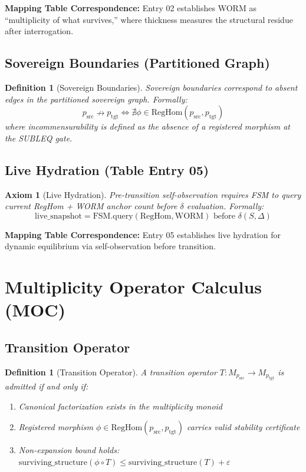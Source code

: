 \documentclass[11pt,a4paper]{article}
\newtheorem{definition}[theorem]{Definition}
\newtheorem{axiom}[theorem]{Axiom}
\begin{document}
\textbf{Mapping Table Correspondence:} Entry 02 establishes WORM as ``multiplicity of what survives,'' where thickness measures the structural residue after interrogation.

\subsection{Sovereign Boundaries (Partitioned Graph)}

\begin{definition}[Sovereign Boundaries]\label{def:boundaries}
Sovereign boundaries correspond to absent edges in the partitioned sovereign graph. Formally:
$$p_{\text{src}} \nrightarrow p_{\text{tgt}} \iff \nexists \phi \in \text{RegHom}(p_{\text{src}}, p_{\text{tgt}})$$
where incommensurability is defined as the absence of a registered morphism at the SUBLEQ gate.
\end{definition}

\subsection{Live Hydration (Table Entry 05)}

\begin{axiom}[Live Hydration]\label{axiom:hydration}
Pre-transition self-observation requires FSM to query current RegHom + WORM anchor count before $\delta$ evaluation. Formally:
$$\text{live\_snapshot} = \text{FSM.query}(\text{RegHom}, \text{WORM}) \text{ before } \delta(S, \Delta)$$
\end{axiom}

\textbf{Mapping Table Correspondence:} Entry 05 establishes live hydration for dynamic equilibrium via self-observation before transition.

\section{Multiplicity Operator Calculus (MOC)}

\subsection{Transition Operator}

\begin{definition}[Transition Operator]\label{def:transition}
A transition operator $T: M_{p_{\text{src}}} \to M_{p_{\text{tgt}}}$ is admitted if and only if:
\begin{enumerate}
    \item Canonical factorization exists in the multiplicity monoid
    \item Registered morphism $\phi \in \text{RegHom}(p_{\text{src}}, p_{\text{tgt}})$ carries valid stability certificate
    \item Non-expansion bound holds: $\text{surviving\_structure}(\phi \circ T) \leq \text{surviving\_structure}(T) + \varepsilon$
\end{enumerate}
\end{definition}
\end{document}

